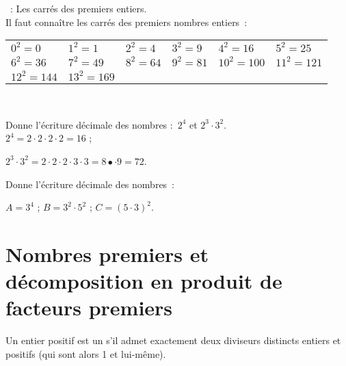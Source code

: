 \vspace{8em}

\begin{methode*1}

\begin{exemple*1}
 : Les carrés des premiers entiers. \\[1em]
Il faut connaître les carrés des premiers nombres entiers : 

\begin{tabularx}{0.7\textwidth}{llllll}
$0^2 = 0$	& $1^2 = 1$ & $2^2 = 4$ & $3^2 = 9$ & $4^2 = 16$ & $5^2 = 25$ \\
$6^2 = 36$ & $7^2 = 49$ & $8^2 = 64$ & $9^2 = 81$ & $10^2 = 100$ & $11^2 = 121$ \\ 
$12^2 = 144$ & $13^2 = 169$ & & & & \\
 \end{tabularx} \\
 \end{exemple*1}

\begin{exemple*1}
Donne l'écriture décimale des nombres : $2^4$ et $2^3 \cdot 3^2$. \\[1em]
$2^4 =  2 \cdot 2 \cdot 2 \cdot 2 = 16$ ;

$2^3 \cdot 3^2 = 2 \cdot 2 \cdot 2 \cdot 3 \cdot 3 = 8 •\cdot 9 = 72$.
 \end{exemple*1}

\exercice  
Donne l'écriture décimale des nombres : 

$A = 3^4$ ; $B = 3^2 \cdot 5^2$ ; $C = (5 \cdot 3)^2$.



 \end{methode*1}
 
 

\newpage

\section{Nombres premiers et décomposition en produit de facteurs premiers}


\vspace{6em}

\begin{definition}
Un entier positif est un  s'il admet exactement deux diviseurs distincts entiers et positifs (qui sont alors 1 et lui-même).
\end{definition}

